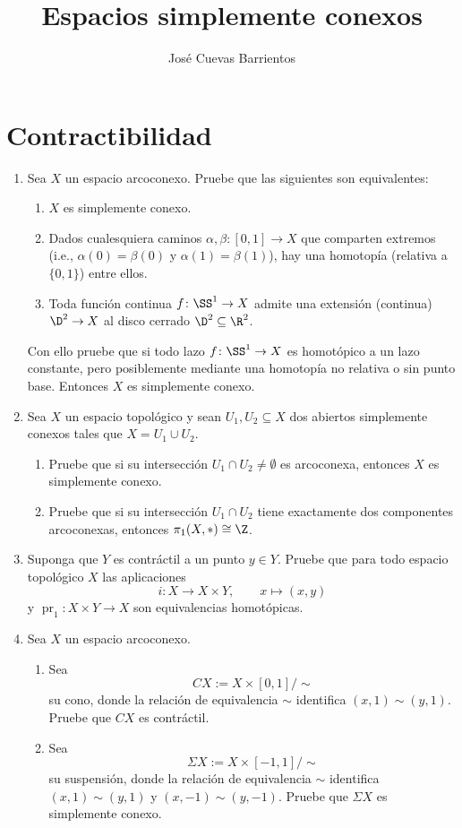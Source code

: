 \documentclass[11pt, reqno]{amsart}
\title{Espacios simplemente conexos}
\date{\DTMdate{2026-10-01}}
\author{José Cuevas Barrientos}
\DeclareMathOperator\pr{pr}
\begin{document}
\maketitle

\section{Contractibilidad}
\begin{enumerate}
	\item Sea $X$ un espacio arcoconexo.
		Pruebe que las siguientes son equivalentes:
		\begin{enumerate}
			\item $X$ es simplemente conexo.
			\item Dados cualesquiera caminos $\alpha, \beta \colon [0, 1] \to X$ que comparten extremos (i.e., $\alpha(0) =
				\beta(0)$ y $\alpha(1) = \beta(1)$), hay una homotopía (relativa a $\{0, 1 \}$) entre ellos.
			\item Toda función continua $f \colon \SS^1 \to X$ admite una extensión (continua) $\D^2 \to X$ al disco cerrado $\D^2 \subseteq \R^2$.
		\end{enumerate}
		Con ello pruebe que si todo lazo $f \colon \SS^1 \to X$ es homotópico a un lazo constante, pero posiblemente mediante una homotopía no
		relativa o sin punto base.
		Entonces $X$ es simplemente conexo.

	\item\label{ex:easy_van_Kampen}
		Sea $X$ un espacio topológico y sean $U_1, U_2 \subseteq X$ dos abiertos simplemente conexos tales que $X = U_1 \cup U_2$.
		\begin{enumerate}
			\item Pruebe que si su intersección $U_1 \cap U_2 \ne \emptyset$ es arcoconexa, entonces $X$ es simplemente conexo.
			\item\lookst
				Pruebe que si su intersección $U_1 \cap U_2$ tiene exactamente dos componentes arcoconexas, entonces $\pi_1(X,*) \cong \Z$.
		\end{enumerate}

	\item Suponga que $Y$ es contráctil a un punto $y \in Y$.
		Pruebe que para todo espacio topológico $X$ las aplicaciones
		\[
			i \colon X \longrightarrow X \times Y, \qquad x \longmapsto (x, y)
		\]
		y $\pr_1 \colon X\times Y \to X$ son equivalencias homotópicas.

	\item Sea $X$ un espacio arcoconexo.
		\begin{enumerate}
			\item Sea
				\[
					C X := X \times [0,1] / {\sim}
				\]
				su cono, donde la relación de equivalencia $\sim$ identifica $(x,1) \sim (y,1)$.
				Pruebe que $CX$ es contráctil.

			\item\label{ex:suspension_simply_conn}
				Sea 
				\[
					\Sigma X := X \times [-1,1] / {\sim}
				\]
				su suspensión, donde la relación de equivalencia $\sim$ identifica $(x,1) \sim (y,1)$ y $(x,-1) \sim (y,-1)$.
				Pruebe que $\Sigma X$ es simplemente conexo.
		\end{enumerate}
\end{enumerate}
\end{document}
